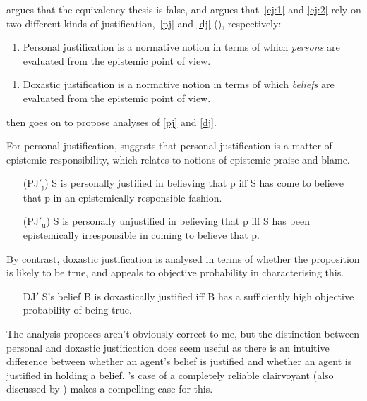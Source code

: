 \documentclass[10pt]{article}
\begin{document}
\citeauthor{Engel:1992aa} argues that the equivalency thesis is false, and argues that~\ref{ej:1} and \ref{ej:2} rely on two different kinds of justification,~\ref{pj} and \ref{dj} (\citeyear[136]{Engel:1992aa}), respectively:

\begin{enumerate}[label=(PJ), ref=(PJ), leftmargin=\parindent*3]
\item\label{pj} Personal justification is a normative notion in terms of which \emph{persons} are evaluated from the epistemic point of view.
\end{enumerate}

\begin{enumerate}[label=(DJ), ref=(DJ), leftmargin=\parindent*3]
\item\label{dj} Doxastic justification is a normative notion in terms of which \emph{beliefs} are evaluated from the epistemic point of view.
\end{enumerate}

\citeauthor{Engel:1992aa} then goes on to propose analyses of \ref{pj} and \ref{dj}.

For personal justification, \citeauthor{Engel:1992aa} suggests that personal justification is a matter of epistemic responsibility, which \citeauthor{Engel:1992aa} relates to notions of epistemic praise and blame.

\begin{enumerate}[label=(PJ), ref=(PJ), leftmargin=\parindent*3]
\item[(PJ\('_{\text{j}}\))] S is personally justified in believing that p iff S has come to believe that p in an epistemically responsible fashion.
\item[(PJ\('_{\text{u}}\))] S is personally unjustified in believing that p iff S has been epistemically irresponsible in coming to believe that p.
\end{enumerate}

By contrast, doxastic justification is analysed in terms of whether the proposition is likely to be true, and \citeauthor{Engel:1992aa} appeals to objective probability in characterising this.

\begin{enumerate}[label=(DJ), ref=(DJ), leftmargin=\parindent*3]
\item[DJ\('\)] S's belief B is doxastically justified iff B has a sufficiently high objective probability of being true.
\end{enumerate}

The analysis \citeauthor{Engel:1992aa} proposes aren't obviously correct to me, but the distinction between personal and doxastic justification does seem useful as there is an intuitive difference between whether an agent's belief is justified and whether an agent is justified in holding a belief.
\cite{BonJour:1980aa}'s case of a completely reliable clairvoyant (also discussed by \citeauthor{Engel:1992aa}) makes a compelling case for this.
\end{document}
